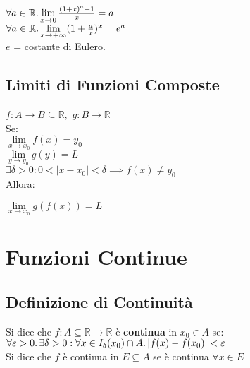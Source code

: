 \documentclass[a4paper, twoside, italian, 11pt]{book}
\newcommand{\abs}[1] {\left | #1 \right |}
\newcommand{\R}{\mathbb{R}}
\begin{document}
\noindent
$\forall a \in \R \ldotp \lim\limits_{x \to 0} \frac{(1+x)^a-1}{x} = a$ \\

\noindent
$\forall a \in \R \ldotp \lim\limits_{x \to +\infty} (1 + \frac a x)^x = e^a$ \\

\noindent
$e$ = costante di Eulero.



\section{Limiti di Funzioni Composte}

\noindent
$f : A \rightarrow B \subseteq \R,$ $g : B \rightarrow \R$ \\

\noindent
Se: \\

$\lim\limits_{x \to x_0} f(x) = y_0$ \\

$\lim\limits_{y \to y_0} g(y) = L$ \\

$\exists \delta > 0 : 0 < \abs{x - x_0} < \delta \implies f(x) \neq y_0$ \\

\noindent
Allora:

\noindent
$\lim\limits_{x \to x_0} g(f(x)) = L$



\chapter{Funzioni Continue}



\section{Definizione di Continuità}

\noindent
Si dice che $f : A \subseteq \R \rightarrow \R$ è \textbf{continua} in $x_0 \in A$ se: \\

$\forall \varepsilon > 0 \ldotp \exists \delta > 0 : \forall x \in I_\delta(x_0) \cap A \ldotp \abs{f(x) - f(x_0)} < \varepsilon$ \\

\noindent
Si dice che $f$ è continua in $E \subseteq A$ se è continua $\forall x \in E$ \\\\
\end{document}
